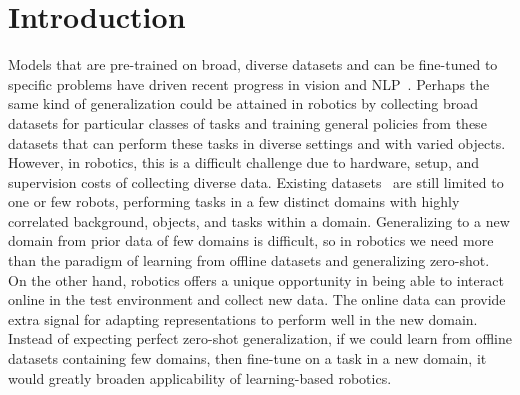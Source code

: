 \documentclass[letterpaper, 10 pt, conference, final]{ieeeconf}   %
\begin{document}


\section{Introduction}

Models that are pre-trained on broad, diverse datasets and can be fine-tuned to specific problems have driven recent progress in vision and NLP~\cite{krizhevsky2012imagenet, devlin2019bert}.
Perhaps the same kind of generalization could be attained in robotics by collecting broad datasets for particular classes of tasks and training general policies from these datasets that can perform these tasks in diverse settings and with varied objects.
However, in robotics, this is a difficult challenge due to hardware, setup, and supervision costs of collecting diverse data.
Existing datasets~\cite{ebert2021bridge, dasari2019robonet} are still limited to one or few robots, performing tasks in a few distinct domains with highly correlated background, objects, and tasks within a domain.
Generalizing to a new domain from prior data of few domains is difficult, so in robotics we need more than the paradigm of learning from offline datasets and generalizing zero-shot.
On the other hand, robotics offers a unique opportunity in being able to interact online in the test environment and collect new data.
The online data can provide extra signal for adapting representations to perform well in the new domain.
Instead of expecting perfect zero-shot generalization, if we could learn from offline datasets containing few domains, then fine-tune on a task in a new domain, it would greatly broaden applicability of learning-based robotics.
\end{document}
